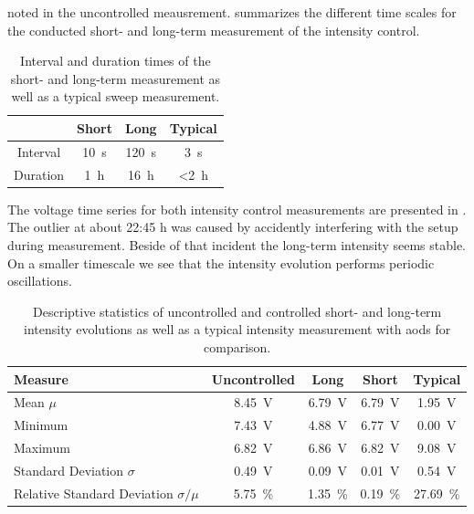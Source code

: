 noted in the uncontrolled meausrement. 
summarizes the different time scales for the conducted short- and long-term
measurement of the intensity control.
\begin{table}[htb]
  \centering
  \begin{tabular}{cccc}
    \toprule
    & Short & Long & Typical \\
    \midrule
    Interval &
    \SI{10}{\second} &
    \SI{120}{\second} &
    \SI{3}{\second} \\
    Duration &
    \SI{1}{\hour} &
    \SI{16}{\hour} &
    \SI{<2}{\hour} \\
    \bottomrule
  \end{tabular}
  \caption{Interval and duration times of the short- and long-term measurement
    as well as a typical sweep measurement.
  }\label{tab:intensity_control_times}
\end{table}
The voltage time series for both intensity control measurements are presented
in . The outlier at about 22:45 h was caused by
accidently interfering with the setup during measurement. Beside of that
incident the long-term intensity seems stable. On a smaller timescale we see
that the intensity evolution performs periodic oscillations.
\begin{table}[htb]
  \centering
  \begin{tabular}{lcccc}
    \toprule
    Measure & Uncontrolled & Long & Short & Typical \\
    \midrule
    Mean $\mu$ &
    \SI{8.45}{\volt} &
    \SI{6.79}{\volt} &
    \SI{6.79}{\volt} &
    \SI{1.95}{\volt} \\
    Minimum &
    \SI{7.43}{\volt} &
    \SI{4.88}{\volt} &
    \SI{6.77}{\volt} &
    \SI{0.00}{\volt} \\
    Maximum &
    \SI{6.82}{\volt} &
    \SI{6.86}{\volt} &
    \SI{6.82}{\volt} &
    \SI{9.08}{\volt} \\
    Standard Deviation $\sigma$ &
    \SI{0.49}{\volt} &
    \SI{0.09}{\volt} &
    \SI{0.01}{\volt} &
    \SI{0.54}{\volt} \\
    Relative Standard Deviation $\sigma/\mu$ &
    \SI{5.75}{\percent} &
    \SI{1.35}{\percent} &
    \SI{0.19}{\percent} &
    \SI{27.69}{\percent} \\
    \bottomrule
  \end{tabular}
  \caption{Descriptive statistics of uncontrolled and controlled short- and
    long-term intensity evolutions as well as a typical intensity measurement
    with \gls{aod}s for comparison.
  }\label{tab:intensity_control_statistics}
\end{table}
